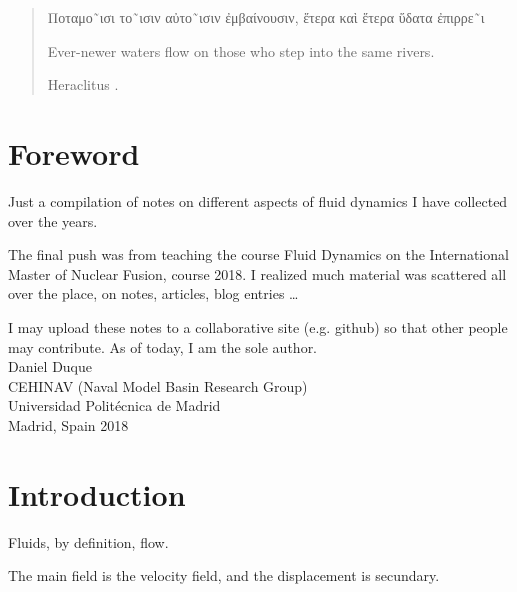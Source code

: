 \chapter*{}

\vspace{6ex}
\begin{quote}
  \greektext

  Ποταμο˜ισι το˜ισιν αὐτο˜ισιν ἐμβαίνουσιν, ἕτερα καὶ ἕτερα ὕδατα ἐπιρρε˜ι  \\%
  \latintext
  \begin{em}
    Ever-newer waters flow on those who step into the same rivers.  \\%
  \end{em}
  Heraclitus \cite{Diels-Kranz}.%
\end{quote}


\newpage

\chapter*{Foreword}


Just a compilation of notes on different aspects of fluid
dynamics I have collected over the years.

The final push was from teaching the course Fluid Dynamics on the
International Master of Nuclear Fusion, course 2018. I realized much
material was scattered all over the place, on notes, articles, blog
entries \ldots

I may upload these notes to a collaborative site (e.g. github) so that
other people may contribute. As of today, I am the sole author.\\[4cm]

Daniel Duque \\
CEHINAV (Naval Model Basin Research Group) \\
Universidad Polit\'ecnica de Madrid \\
Madrid, Spain 2018


\chapter{Introduction}

Fluids, by definition, flow.

The main field is the velocity field, and the displacement is
secundary.


